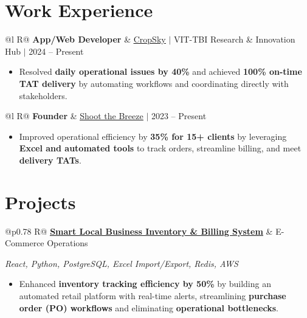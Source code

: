 \documentclass[a4paper,10pt]{article}
\newcommand{\ulink}[2]{\href{#1}{\uline{#2}}}
\newcommand{\subheading}[1]{{\color[HTML]{0A0A0A}\fontsize{12}{14}\selectfont\bfseries #1}}
\newcommand{\techstack}[1]{{\color[HTML]{5C5C5C}\fontsize{10.5}{12.5}\selectfont\itshape #1}}
\newcommand{\meta}[1]{{\color[HTML]{5C5C5C}\fontsize{10.5}{12.5}\selectfont #1}}
\begin{document}
\section{Work Experience}
\vspace{2pt}

\begin{tabularx}{\linewidth}{@{}l R@{}}
\subheading{App/Web Developer} & \meta{\ulink{https://sites.google.com/view/cropsky/home}{CropSky} $|$ VIT-TBI Research \& Innovation Hub $|$ 2024 -- Present}
\end{tabularx}
\begin{itemize}[nosep, leftmargin=1.5em, itemsep=1pt, topsep=2pt]
  \item {\color[HTML]{0A0A0A}\fontsize{11}{14}\selectfont Resolved \textbf{daily operational issues by 40\%} and achieved \textbf{100\% on-time TAT delivery} by automating workflows and coordinating directly with stakeholders.}
\end{itemize}

\vspace{2pt}

\begin{tabularx}{\linewidth}{@{}l R@{}}
\subheading{Founder} & \meta{\ulink{https://shoot-the-breeze.vercel.app}{Shoot the Breeze} $|$ 2023 -- Present}
\end{tabularx}
\begin{itemize}[nosep, leftmargin=1.5em, itemsep=1pt, topsep=2pt]
  \item {\color[HTML]{0A0A0A}\fontsize{11}{14}\selectfont Improved operational efficiency by \textbf{35\% for 15+ clients} by leveraging \textbf{Excel and automated tools} to track orders, streamline billing, and meet \textbf{delivery TATs}.}
\end{itemize}

\vspace{2pt}

\section{Projects}
\vspace{2pt}

\begin{tabularx}{\linewidth}{@{}p{0.78\linewidth} R@{}}
\subheading{\ulink{https://github.com/su-jin1425/Smart-Local-Business-Inventory-Billing-System}{Smart Local Business Inventory \& Billing System}} & \meta{E-Commerce Operations}
\end{tabularx}
\vspace{1pt}
\techstack{React, Python, PostgreSQL, Excel Import/Export, Redis, AWS}
\begin{itemize}[nosep, leftmargin=1.5em, itemsep=1pt, topsep=2pt]
  \item {\color[HTML]{0A0A0A}\fontsize{11}{14}\selectfont Enhanced \textbf{inventory tracking efficiency by 50\%} by building an automated retail platform with real-time alerts, streamlining \textbf{purchase order (PO) workflows} and eliminating \textbf{operational bottlenecks}.}
\end{itemize}
\end{document}
